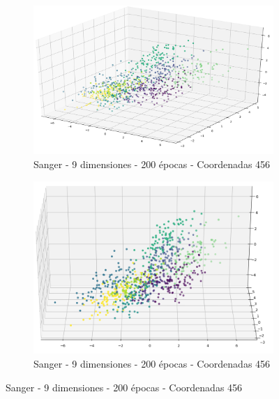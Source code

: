 \begin{figure}[!htbp]
\centering
\begin{subfigure}{.5\textwidth}
  \centering
  \includegraphics[width=1\linewidth, scale=1]{../img/ej1/sanger_corrida_200_9/sanger_9salida_200ep_testing_dim456.png}
  \caption{Sanger - 9 dimensiones - 200 épocas - Coordenadas 456}
  \label{fig:sub1}
\end{subfigure}%
\begin{subfigure}{.5\textwidth}
  \centering
  \includegraphics[width=1\linewidth, scale=1]{../img/ej1/sanger_corrida_200_9/sanger_9salida_200ep_testing_dim456_2.png}
  \caption{Sanger - 9 dimensiones - 200 épocas - Coordenadas 456}
  \label{fig:sub2}
\end{subfigure}
\end{figure}

